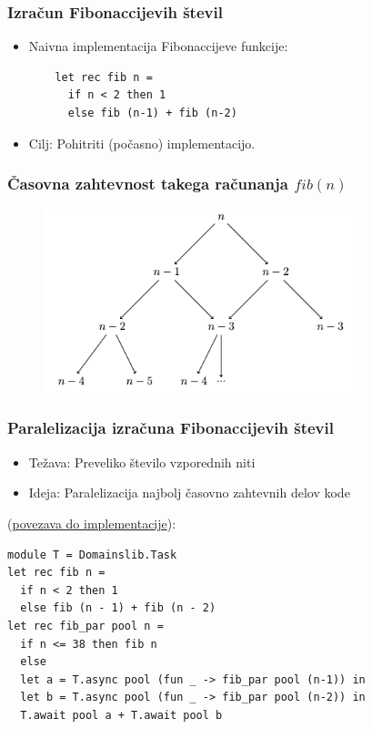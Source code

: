\documentclass{beamer}
\begin{document}
\begin{frame}[fragile]
    \frametitle{Izračun Fibonaccijevih števil}
    \begin{itemize}
        \item Naivna implementacija Fibonaccijeve funkcije:
    \begin{verbatim}
    let rec fib n =
      if n < 2 then 1
      else fib (n-1) + fib (n-2)
    \end{verbatim}
        \item Cilj: Pohitriti (počasno) implementacijo.
    \end{itemize}
\end{frame}

\begin{frame}
  \frametitle{Časovna zahtevnost takega računanja $fib(n)$}
  \begin{figure}
      \centering
      \includegraphics[width=9cm]{slike/casovna_zahtevnost_racunanja_fib.png}
      \label{fig:casovna_zahtevnost_racunanja_fib}
    \end{figure}
\end{frame}

\begin{frame}[fragile]
    \frametitle{Paralelizacija izračuna Fibonaccijevih števil}
    \begin{itemize}
        \item Težava: Preveliko število vzporednih niti
        \item Ideja: Paralelizacija najbolj časovno zahtevnih delov kode
        \end{itemize}
        (\href{https://github.com/tjazerzen/parallelisation-of-graph-algorithms-in-functional-programming-languages/blob/parallel_fibonacci/playground/graph/fib.ml}{povezava do implementacije}):

        \begin{verbatim}
module T = Domainslib.Task
let rec fib n = 
  if n < 2 then 1 
  else fib (n - 1) + fib (n - 2)
let rec fib_par pool n =
  if n <= 38 then fib n
  else
  let a = T.async pool (fun _ -> fib_par pool (n-1)) in
  let b = T.async pool (fun _ -> fib_par pool (n-2)) in
  T.await pool a + T.await pool b
    \end{verbatim}
\end{frame}
\end{document}
